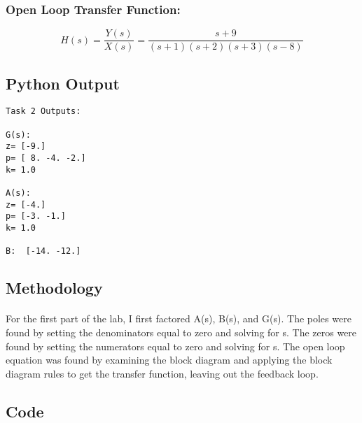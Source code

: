 \subsubsection{Open Loop Transfer Function: }
\[H(s)=\frac{Y(s)}{X(s)} = \frac{s+9}{(s+1)(s+2)(s+3)(s-8)}\]

\subsection{Python Output}
\begin{small}
\begin{lstlisting}
Task 2 Outputs: 

G(s):
z= [-9.]
p= [ 8. -4. -2.]
k= 1.0

A(s):
z= [-4.]
p= [-3. -1.]
k= 1.0

B:  [-14. -12.]
\end{lstlisting}
\end{small}



\subsection{Methodology}


\paragraph{}
For the first part of the lab, I first factored A(s), B(s), and G(s).  The poles were found by setting the denominators equal to zero and solving for s.  The zeros were found by setting the numerators equal to zero and solving for s.  The open loop equation was found by examining the block diagram and applying the block diagram rules to get the transfer function, leaving out the feedback loop.
\subsection{Code}

